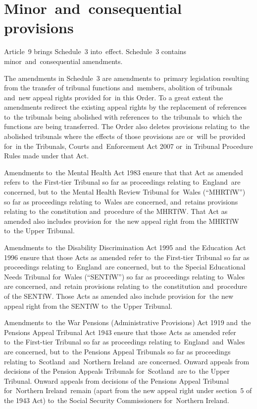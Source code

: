 \documentclass[12pt,a4paper]{article}
\begin{document}
\section*{Minor~and~consequential provisions}

Article~9 brings Schedule~3 into~effect. Schedule~3 contains minor~and~consequential amendments.

The amendments in Schedule~3 are amendments to~primary legislation resulting from the transfer of tribunal functions and~members, abolition of tribunals and~new appeal rights provided for~in this Order. To a great extent the amendments redirect the existing appeal rights by the replacement of references to~the tribunals being abolished with references to~the tribunals to~which the functions are being transferred. The Order also deletes provisions relating to~the abolished tribunals where the effects of those provisions are or~will be provided for~in the Tribunals, Courts and~Enforcement Act 2007 or~in Tribunal Procedure Rules made under that Act.

Amendments to~the Mental Health Act 1983 ensure that that Act as amended refers to~the First-tier Tribunal so far as proceedings relating to~England~are concerned, but to~the Mental Health Review Tribunal for~Wales (“MHRTfW”) so far as proceedings relating to~Wales are concerned, and~retains provisions relating to~the constitution and~procedure of the MHRTfW. That Act as amended also includes provision for~the new appeal right from the MHRTfW to~the Upper Tribunal.

Amendments to~the Disability Discrimination Act 1995 and~the Education Act 1996 ensure that those Acts as amended refer to~the First-tier Tribunal so far as proceedings relating to~England~are concerned, but to~the Special Educational Needs Tribunal for~Wales (“SENTfW”) so far as proceedings relating to~Wales are concerned, and~retain provisions relating to~the constitution and~procedure of the SENTfW. Those Acts as amended also include provision for~the new appeal right from the SENTfW to~the Upper Tribunal.

Amendments to~the War Pensions (Administrative Provisions) Act 1919 and~the Pensions Appeal Tribunal Act 1943 ensure that those Acts as amended refer to~the First-tier Tribunal so far as proceedings relating to~England~and~Wales are concerned, but to~the Pensions Appeal Tribunals so far as proceedings relating to~Scotland~and~Northern Ireland~are concerned. Onward appeals from decisions of the Pension Appeals Tribunals for~Scotland~are to~the Upper Tribunal. Onward appeals from decisions of the Pensions Appeal Tribunal for~Northern Ireland~remain (apart from the new appeal right under section~5 of the 1943 Act) to~the Social Security Commissioners for~Northern Ireland.
\end{document}
